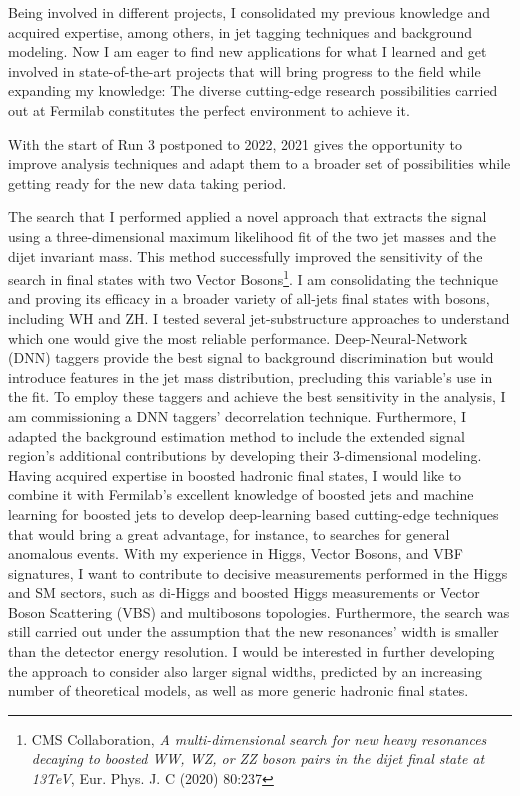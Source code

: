 {\begin{flushleft}
\vspace{\baselineskip}
 Being involved in different projects, I consolidated my previous knowledge and acquired expertise, among others, in jet tagging techniques and background modeling. Now I am eager to find new applications for what I learned and get involved in state-of-the-art projects that will bring progress to the field while expanding my knowledge: The diverse cutting-edge research possibilities carried out at Fermilab constitutes the perfect environment to achieve it.

\vspace{\baselineskip}
With the start of Run 3 postponed to 2022, 2021 gives the opportunity to improve analysis techniques and adapt them to a broader set of possibilities while getting ready for the new data taking period. 


\vspace{\baselineskip}

The search that I performed applied a novel approach that extracts the signal using a three-dimensional maximum likelihood fit of the two jet masses and the dijet invariant mass. This method successfully improved the sensitivity of the search in final states with two Vector Bosons\footnote{CMS Collaboration, {\em A multi-dimensional search for new heavy resonances decaying to boosted WW, WZ, or ZZ boson pairs in the dijet final state at 13TeV}, Eur. Phys. J. C (2020) 80:237}.
I am consolidating the technique and proving its efficacy in a broader variety of all-jets final states with bosons, including WH and ZH.
I tested several jet-substructure approaches to understand which one would give the  most reliable performance. Deep-Neural-Network (DNN) taggers provide the best signal to background discrimination but would introduce features in the jet mass distribution, precluding this variable's use in the fit. To employ these taggers and achieve the best sensitivity in the analysis, I am commissioning a DNN taggers' decorrelation technique. Furthermore, I adapted the background estimation method to include the extended signal region's additional contributions by developing their 3-dimensional modeling. 
Having acquired expertise in boosted hadronic final states, I would like to combine it with Fermilab's excellent knowledge of boosted jets and machine learning for boosted jets to develop deep-learning based cutting-edge techniques that would bring a great advantage, for instance, to searches for general anomalous events. With my experience in Higgs, Vector Bosons, and VBF signatures, I want to contribute to decisive measurements performed in the Higgs and SM sectors, such as di-Higgs and boosted Higgs measurements or Vector Boson Scattering (VBS) and multibosons topologies. 
Furthermore, the search was still carried out under the assumption that the new resonances' width is smaller than the detector energy resolution. I would be interested in further developing the approach to consider also larger signal widths, predicted by an increasing number of theoretical models, as well as more generic hadronic final states.


\end{flushleft}}
